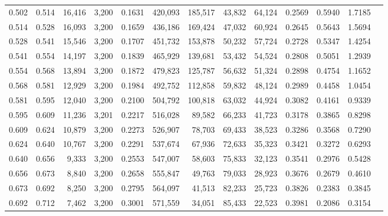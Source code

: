 \begin{tabular}{rrrrrrrrrrrrr}
0.502 & 0.514 & 16,416 & 3,200 &                                     0.1631 & 420,093 & 185,517 &  43,832 &  64,124 & 0.2569 & 0.5940 & 1.7185 \\
0.514 & 0.528 & 16,093 & 3,200 &                                     0.1659 & 436,186 & 169,424 &  47,032 &  60,924 & 0.2645 & 0.5643 & 1.5694 \\
0.528 & 0.541 & 15,546 & 3,200 &                                     0.1707 & 451,732 & 153,878 &  50,232 &  57,724 & 0.2728 & 0.5347 & 1.4254 \\
0.541 & 0.554 & 14,197 & 3,200 &                                     0.1839 & 465,929 & 139,681 &  53,432 &  54,524 & 0.2808 & 0.5051 & 1.2939 \\
0.554 & 0.568 & 13,894 & 3,200 &                                     0.1872 & 479,823 & 125,787 &  56,632 &  51,324 & 0.2898 & 0.4754 & 1.1652 \\
0.568 & 0.581 & 12,929 & 3,200 &                                     0.1984 & 492,752 & 112,858 &  59,832 &  48,124 & 0.2989 & 0.4458 & 1.0454 \\
0.581 & 0.595 & 12,040 & 3,200 &                                     0.2100 & 504,792 & 100,818 &  63,032 &  44,924 & 0.3082 & 0.4161 & 0.9339 \\
0.595 & 0.609 & 11,236 & 3,201 &                                     0.2217 & 516,028 &  89,582 &  66,233 &  41,723 & 0.3178 & 0.3865 & 0.8298 \\
0.609 & 0.624 & 10,879 & 3,200 &                                     0.2273 & 526,907 &  78,703 &  69,433 &  38,523 & 0.3286 & 0.3568 & 0.7290 \\
0.624 & 0.640 & 10,767 & 3,200 &                                     0.2291 & 537,674 &  67,936 &  72,633 &  35,323 & 0.3421 & 0.3272 & 0.6293 \\
0.640 & 0.656 &  9,333 & 3,200 &                                     0.2553 & 547,007 &  58,603 &  75,833 &  32,123 & 0.3541 & 0.2976 & 0.5428 \\
0.656 & 0.673 &  8,840 & 3,200 &                                     0.2658 & 555,847 &  49,763 &  79,033 &  28,923 & 0.3676 & 0.2679 & 0.4610 \\
0.673 & 0.692 &  8,250 & 3,200 &                                     0.2795 & 564,097 &  41,513 &  82,233 &  25,723 & 0.3826 & 0.2383 & 0.3845 \\
0.692 & 0.712 &  7,462 & 3,200 &                                     0.3001 & 571,559 &  34,051 &  85,433 &  22,523 & 0.3981 & 0.2086 & 0.3154 \\

\end{tabular}
